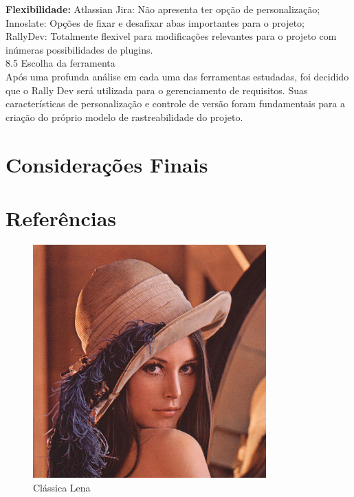 \textbf{Flexibilidade:}
	\tab Atlassian Jira: Não apresenta ter opção de personalização;\\
	\tab Innoslate: Opções de fixar e desafixar abas importantes para o projeto;\\
	\tab RallyDev: Totalmente flexivel para modificações relevantes para o projeto com inúmeras possibilidades de plugins.\\

{\large{8.5 Escolha da ferramenta}}\\

\tab Após uma profunda análise em cada uma das ferramentas estudadas, foi decidido que o Rally Dev será utilizada para o gerenciamento de requisitos. Suas características de personalização e controle de versão foram fundamentais para a criação do próprio modelo de rastreabilidade do projeto.  \\


\section{Considerações Finais}
\label{sec:nova_sess_o}

\section{Referências}
\label{sec:nova_sess_o}




\onecolumn
\begin{usecase}



\end{usecase}
\onecolumn

\onecolumn
\begin{figure}[h]
  \begin{center}
    \includegraphics[width=0.8\textwidth]{conteudo/lena}
    \caption{Clássica Lena}
  \end{center}
\end{figure}
\onecolumn

